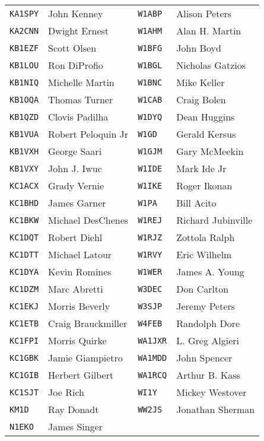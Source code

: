 \documentclass[10pt,letterpaper]{article}
\begin{document}
\begin{enumerate}
\begin{enumerate}
\begin{tabular}{|ll||ll|}
  \texttt{KA1SPY} & John Kenney         & \texttt{W1ABP}  & Alison Peters       \\
  \texttt{KA2CNN} & Dwight Ernest       & \texttt{W1AHM}  & Alan H. Martin      \\
  \texttt{KB1EZF} & Scott Olsen         & \texttt{W1BFG}  & John Boyd           \\
  \texttt{KB1LOU} & Ron DiProfio        & \texttt{W1BGL}  & Nicholas Gatzios    \\
  \texttt{KB1NIQ} & Michelle Martin     & \texttt{W1BNC}  & Mike Keller         \\
  \texttt{KB1OQA} & Thomas Turner       & \texttt{W1CAB}  & Craig Bolen         \\
  \texttt{KB1QZD} & Clovis Padilha      & \texttt{W1DYQ}  & Dean  Huggins       \\
  \texttt{KB1VUA} & Robert Peloquin Jr  & \texttt{W1GD}   & Gerald  Kersus      \\
  \texttt{KB1VXH} & George Saari        & \texttt{W1GJM}  & Gary McMeekin       \\
  \texttt{KB1VXY} & John J. Iwuc        & \texttt{W1IDE}  & Mark Ide Jr         \\
  \texttt{KC1ACX} & Grady Vernie        & \texttt{W1IKE}  & Roger Ikonan        \\
  \texttt{KC1BHD} & James Garner        & \texttt{W1PA}   & Bill Acito          \\
  \texttt{KC1BKW} & Michael DesChenes   & \texttt{W1REJ}  & Richard Jubinville  \\
  \texttt{KC1DQT} & Robert Diehl        & \texttt{W1RJZ}  & Zottola Ralph       \\
  \texttt{KC1DTT} & Michael Latour      & \texttt{W1RVY}  & Eric  Wilhelm       \\
  \texttt{KC1DYA} & Kevin Romines       & \texttt{W1WER}  & James A. Young      \\
  \texttt{KC1DZM} & Marc Abretti        & \texttt{W3DEC}  & Don Carlton         \\
  \texttt{KC1EKJ} & Morris Beverly      & \texttt{W3SJP}  & Jeremy Peters       \\
  \texttt{KC1ETB} & Craig Brauckmiller  & \texttt{W4FEB}  & Randolph Dore       \\
  \texttt{KC1FPI} & Morris Quirke       & \texttt{WA1JXR} & L. Greg Algieri     \\
  \texttt{KC1GBK} & Jamie Giampietro    & \texttt{WA1MDD} & John Spencer        \\
  \texttt{KC1GIB} & Herbert Gilbert     & \texttt{WA1RCQ} & Arthur B. Kass      \\
  \texttt{KC1SJT} & Joe Rich            & \texttt{WI1Y}   & Mickey Westover     \\
  \texttt{KM1D}   & Ray Donadt          & \texttt{WW2JS}  & Jonathan Sherman    \\
  \texttt{N1EKO}  & James Singer        &                 &                     \\
  \hline
  \end{tabular}


\end{enumerate}
\end{enumerate}
\end{document}
